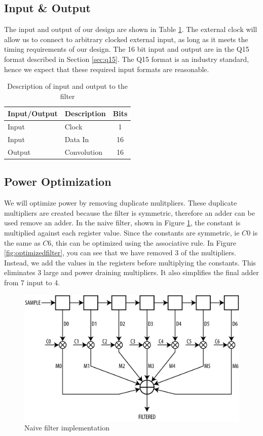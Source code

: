 \subsection{Input \& Output}
The input and output of our design are shown in Table \ref{table:inputoutput}.  The external clock will allow us to connect to arbitrary clocked external input, as long as it meets the timing requirements of our design.  The 16 bit input and output are in the Q15 format described in Section \ref{sec:q15}.  The Q15 format is an industry standard, hence we expect that these required input formats are reasonable.

\begin{table}[ht]
\centering
\begin{tabular}{l | l | c}
\hline
Input/Output & Description & Bits \\
\hline \hline
Input & Clock & 1 \\
Input & Data In & 16 \\
Output & Convolution & 16 \\
\end{tabular}
\caption{Description of input and output to the filter}
\label{table:inputoutput}
\end{table}



\subsection{Power Optimization}

We will optimize power by removing duplicate mulitpliers.  These duplicate multipliers are created because the filter is symmetric, therefore an adder can be used remove an adder.  In the naive filter, shown in Figure \ref{fig:naivefilter}, the constant is multiplied against each register value.  Since the constants are symmetric, ie $C0$ is the same as $C6$, this can be optimized using the associative rule.  In Figure \ref{fig:optimizedfilter}, you can see that we have removed 3 of the multipliers.  Instead, we add the values in the registers before multiplying the constants.  This eliminates 3 large and power draining multipliers.  It also simplifies the final adder from 7 input to 4.


\begin{figure}[ht]
\centering
\includegraphics[width=5in]{images/filter_normal}
\caption{Naive filter implementation}
\label{fig:naivefilter}
\end{figure}

